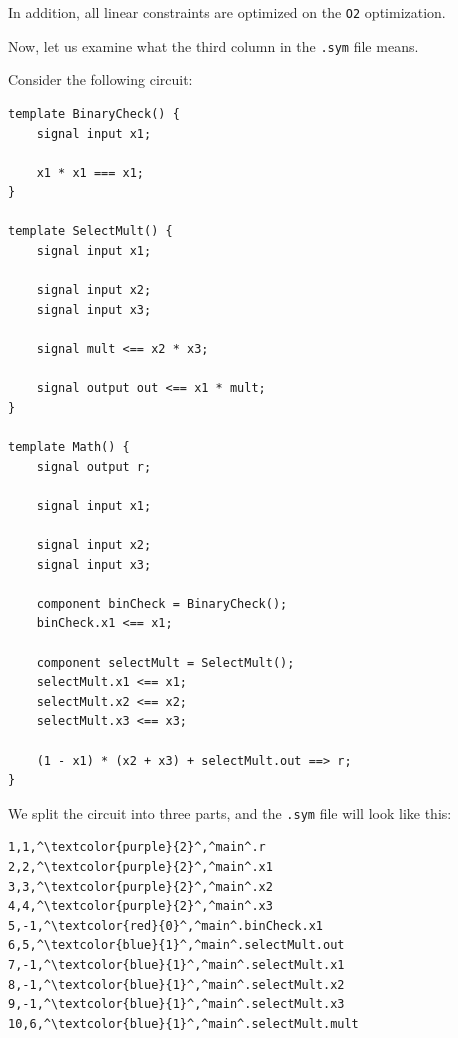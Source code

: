 \documentclass[../../book.tex]{subfiles}
\begin{document}
\begin{remark}
    In addition, all linear constraints are optimized on the \texttt{O2} optimization.
\end{remark}

Now, let us examine what the third column in the \texttt{.sym} file means.

Consider the following circuit:

\begin{lstlisting}[language=Circom,basicstyle=\ttfamily\footnotesize]
template BinaryCheck() {
    signal input x1;

    x1 * x1 === x1;
}

template SelectMult() {
    signal input x1;

    signal input x2;
    signal input x3;

    signal mult <== x2 * x3;

    signal output out <== x1 * mult;
}

template Math() {
    signal output r;

    signal input x1;

    signal input x2;
    signal input x3;

    component binCheck = BinaryCheck();
    binCheck.x1 <== x1;

    component selectMult = SelectMult();
    selectMult.x1 <== x1;
    selectMult.x2 <== x2;
    selectMult.x3 <== x3;

    (1 - x1) * (x2 + x3) + selectMult.out ==> r;
}
\end{lstlisting}

We split the circuit into three parts, and the \texttt{.sym} file will look like this:

\begin{center}
    \begin{tcolorbox}[enhanced,
        width=0.5\textwidth,
        title=\textbf{\footnotesize.sym file for $x_1? \; x_2 \times x_3 : x_2+x_3$ with templates},
        coltitle=gray!25!black,
        attach boxed title to top center={yshift=-2mm,yshifttext=-1mm},
        boxed title style={size=small,colframe=gray!75!black,
        colback=blue!30!white,boxrule=1pt},
        top=-0.35cm,
        bottom=-0.35cm]
        \begin{lstlisting}[language=Circom,numbers=none,basicstyle=\ttfamily\footnotesize,escapechar=^]
1,1,^\textcolor{purple}{2}^,^main^.r
2,2,^\textcolor{purple}{2}^,^main^.x1
3,3,^\textcolor{purple}{2}^,^main^.x2
4,4,^\textcolor{purple}{2}^,^main^.x3
5,-1,^\textcolor{red}{0}^,^main^.binCheck.x1
6,5,^\textcolor{blue}{1}^,^main^.selectMult.out
7,-1,^\textcolor{blue}{1}^,^main^.selectMult.x1
8,-1,^\textcolor{blue}{1}^,^main^.selectMult.x2
9,-1,^\textcolor{blue}{1}^,^main^.selectMult.x3
10,6,^\textcolor{blue}{1}^,^main^.selectMult.mult
        \end{lstlisting}
    \end{tcolorbox}
\end{center}
\end{document}
